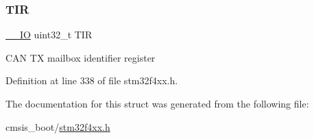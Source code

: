 \subsubsection{\texorpdfstring{T\+IR}{TIR}}
{\footnotesize\ttfamily \hyperlink{group___c_m_s_i_s__core__definitions_gaec43007d9998a0a0e01faede4133d6be}{\+\_\+\+\_\+\+IO} uint32\+\_\+t T\+IR}

C\+AN TX mailbox identifier register 

Definition at line 338 of file stm32f4xx.\+h.



The documentation for this struct was generated from the following file\+:\begin{DoxyCompactItemize}
\item 
cmsis\+\_\+boot/\hyperlink{stm32f4xx_8h}{stm32f4xx.\+h}\end{DoxyCompactItemize}
